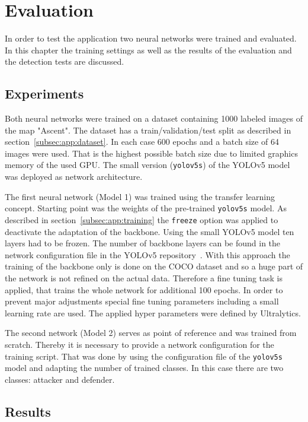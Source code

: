 \chapter{Evaluation}\label{chpt:evaluation}
\glsresetall

In order to test the application two neural networks were trained and evaluated. In this chapter the 
training settings as well as the results of the evaluation and the detection tests are discussed.

\section{Experiments}\label{sec:eval:experiments}

Both neural networks were trained on a dataset containing 1000 labeled images of the map 
"Ascent". The dataset has a train/validation/test split as described in 
section~\ref{subsec:app:dataset}. In each case 600 epochs and a batch size of 64 images were 
used. That is the highest possible batch size due to limited graphics memory of the used GPU. 
The small version (\texttt{yolov5s}) of the YOLOv5 model was deployed as network architecture. 

The first neural network (Model 1) was trained using the transfer learning concept. Starting 
point was the weights of the pre-trained \texttt{yolov5s} model. As described in 
section~\ref{subsec:app:training} the \texttt{freeze} option was applied to deactivate the adaptation 
of the backbone. Using the small YOLOv5 model ten layers had to be frozen. The number of 
backbone layers can be found in the network configuration file in the YOLOv5 
repository~\cite{jocher2020}. With this approach the training of the backbone only is done on the 
COCO dataset and so a huge part of the network is not refined on the actual data. Therefore a fine 
tuning task is applied, that trains the whole network for additional 100 epochs. In order to prevent 
major adjustments special fine tuning parameters including a small learning rate are used. The 
applied hyper parameters were defined by Ultralytics.

The second network (Model 2) serves as point of reference and was trained from scratch. Thereby it 
is necessary to provide a network configuration for the training script. That was done by using the 
configuration file of the \texttt{yolov5s} model and adapting the number of trained classes. In this 
case there are two classes: attacker and defender.

\section{Results}\label{sec:eval:results}

